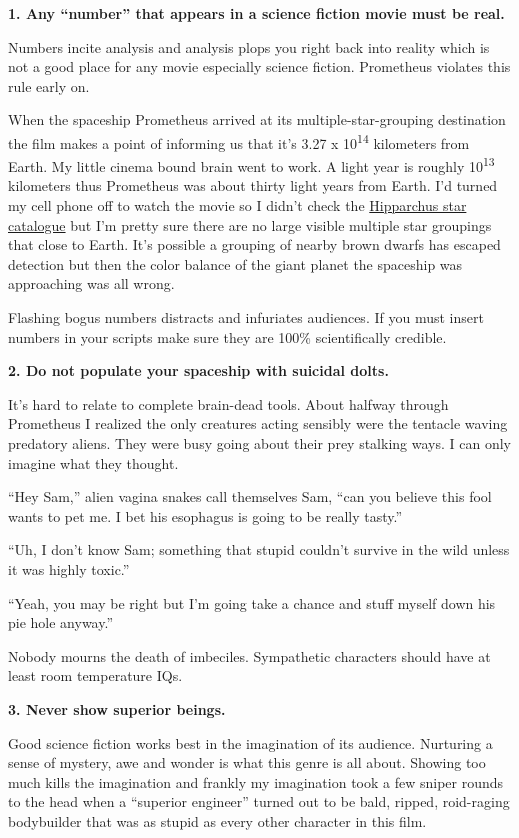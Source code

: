 \medskip
\textbf{1. Any ``number'' that appears in a science fiction movie must
be real.}

Numbers incite analysis and analysis plops you right back into reality
which is not a good place for any movie especially science fiction.
Prometheus violates this rule early on.

When the spaceship Prometheus arrived at its multiple-star-grouping
destination the film makes a point of informing us that it's 3.27 x
10\textsuperscript{14} kilometers from Earth. My little cinema bound
brain went to work. A light year is roughly
10\textsuperscript{13} kilometers thus Prometheus was about thirty light
years from Earth. I'd turned my cell phone off to watch the movie so I
didn't check the
\href{http://heasarc.gsfc.nasa.gov/W3Browse/all/hipparcos.html}{Hipparchus
star catalogue} but I'm pretty sure there are no large visible multiple
star groupings that close to Earth. It's possible a grouping of nearby
brown dwarfs has escaped detection but then the color balance of the
giant planet the spaceship was approaching was all wrong.

Flashing bogus numbers distracts and infuriates audiences. If you must
insert numbers in your scripts make sure they are 100\% scientifically
credible.

\medskip
\textbf{2. Do not populate your spaceship with suicidal dolts.}

It's hard to relate to complete brain-dead tools. About halfway through
Prometheus I realized the only creatures acting sensibly were the
tentacle waving predatory aliens. They were busy going about their prey
stalking ways. I can only imagine what they thought.

``Hey Sam,'' alien vagina snakes call themselves Sam, ``can you believe
this fool wants to pet me. I bet his esophagus is going to be really
tasty.''

``Uh, I don't know Sam; something that stupid couldn't survive in the
wild unless it was highly toxic.''

``Yeah, you may be right but I'm going take a chance and stuff myself
down his pie hole anyway.''

Nobody mourns the death of imbeciles. Sympathetic characters should have
at least room temperature IQs.

\medskip
\textbf{3. Never show superior beings.}

Good science fiction works best in the imagination of its audience.
Nurturing a sense of mystery, awe and wonder is what this genre is all
about. Showing too much kills the imagination and frankly my imagination
took a few sniper rounds to the head when a ``superior engineer'' turned
out to be bald, ripped, roid-raging bodybuilder that was as stupid as
every other character in this film.

